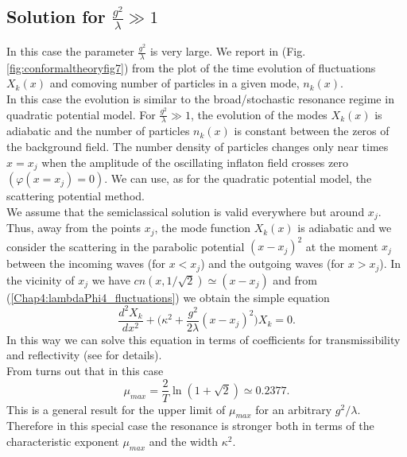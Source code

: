 \documentclass[11pt,a4paper,twoside]{book}
\begin{document}
\subsection*{Solution for  $ \frac{g^{2}}{\lambda} \gg 1 $ }
In this case the parameter $ \frac{g^{2}}{\lambda}$ is very large. We report in (Fig. \ref{fig:conformaltheoryfig7}) from \cite{Chap4:ModelLambdaPhi4Reference} the plot of the time evolution of fluctuations $ X_{k}(x) $ and  comoving number of particles in a given mode, $ n_{k}(x) $.\\ 
In this case the evolution is similar to the broad/stochastic resonance regime in quadratic potential model. For $ \frac{g^{2}}{\lambda} \gg 1 $, the evolution of the modes $ X_{k}(x) $ is adiabatic and the number of particles $ n_{k}(x) $ is constant between the zeros of the background field. The number density of particles changes only near times $ x=x_{j} $  when the amplitude of the oscillating inflaton field crosses zero $ (\varphi(x=x_{j})=0) $. We can use, as for the quadratic potential model, the scattering potential method.\\
We assume that the semiclassical solution is valid everywhere but around $ x_{j} $. Thus, away from the points $ x_{j} $, the mode function $ X_{k}(x) $ is adiabatic and we consider the scattering in the parabolic potential $ (x-x_{j})^{2} $ at the moment $ x_{j} $ between the incoming waves (for $ x<x_{j} $) and the outgoing waves (for $ x > x_{j} $). In the vicinity of $ x_{j} $ we have $ cn(x,1/\sqrt{2})\simeq (x-x_{j}) $ and from (\ref{Chap4:lambdaPhi4_fluctuations}) we obtain the simple equation
\begin{equation}
\label{Chap4:lambdaPhi4_simpleEquationAroundXj}
\frac{d^{2}X_{k}}{dx^{2}} + \Bigg(\kappa^{2} + \frac{g^{2}}{2\lambda}(x-x_{j})^{2}\Bigg) X_{k}= 0.
\end{equation}
In this way we can solve this equation in terms of coefficients  for transmissibility and reflectivity (see \cite{Chap4:ModelLambdaPhi4Reference} for details).\\
From \cite{Chap4:ModelLambdaPhi4Reference } turns out that in this case
\begin{equation}
\label{Chap4:lambdaPhi4_umaxParabolicPotential}
\mu_{max} = \frac{2}{T}\ln(1+\sqrt{2}) \simeq 0.2377.
\end{equation}
This is a general result for the upper limit of $ \mu_{max} $ for an arbitrary $ g^{2}/\lambda $. Therefore in this special case the resonance is stronger both in terms of the characteristic exponent $ \mu_{max} $ and the width $ \kappa^{2} $.
\end{document}
